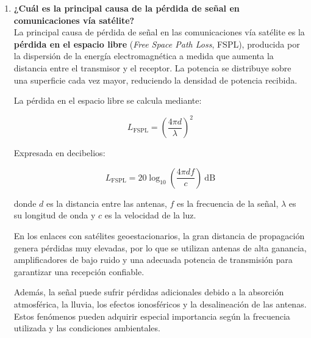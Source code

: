 \documentclass[11pt,a4paper]{article}
\begin{document}
\begin{enumerate}[label=4.\arabic*), itemsep=0.3cm]
La misma antena a 4~GHz da $\approx 35{,}9$~dBi: al dividir la frecuencia por 3, la ganancia cae 9 veces ($\approx 9{,}5$~dB). Por eso un plato DBS de 60~cm a 12~GHz ($\approx 35$~dBi) logra la misma ganancia que una antena de 2~m en banda C.
  \item
        \textbf{¿Cuál es la principal causa de la pérdida de señal en comunicaciones vía satélite?} \\
        La principal causa de pérdida de señal en las comunicaciones vía satélite es la \textbf{pérdida en el espacio libre} (\textit{Free Space Path Loss}, FSPL), producida por la dispersión de la energía electromagnética a medida que aumenta la distancia entre el transmisor y el receptor. La potencia se distribuye sobre una superficie cada vez mayor, reduciendo la densidad de potencia recibida.

        La pérdida en el espacio libre se calcula mediante:

        \begin{equation}
            L_{\mathrm{FSPL}} =
            \left(\frac{4\pi d}{\lambda}\right)^2
        \end{equation}

        Expresada en decibelios:

        \begin{equation}
            L_{\mathrm{FSPL}} =
            20\log_{10}\left(\frac{4\pi d f}{c}\right)
            \ \mathrm{dB}
        \end{equation}

        donde $d$ es la distancia entre las antenas, $f$ es la frecuencia de la señal, $\lambda$ es su longitud de onda y $c$ es la velocidad de la luz.

        En los enlaces con satélites geoestacionarios, la gran distancia de propagación genera pérdidas muy elevadas, por lo que se utilizan antenas de alta ganancia, amplificadores de bajo ruido y una adecuada potencia de transmisión para garantizar una recepción confiable.

        Además, la señal puede sufrir pérdidas adicionales debido a la absorción atmosférica, la lluvia, los efectos ionosféricos y la desalineación de las antenas. Estos fenómenos pueden adquirir especial importancia según la frecuencia utilizada y las condiciones ambientales.


\end{enumerate}
\end{document}
